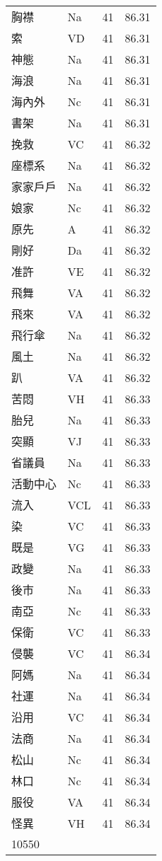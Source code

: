 \documentclass[twocolumn]{book}
\begin{document}
\begin{supertabular}{llrr}
胸襟 & Na & 41 &  86.31\\
索 & VD & 41 &  86.31\\
神態 & Na & 41 &  86.31\\
海浪 & Na & 41 &  86.31\\
海內外 & Nc & 41 &  86.31\\
書架 & Na & 41 &  86.31\\
挽救 & VC & 41 &  86.32\\
座標系 & Na & 41 &  86.32\\
家家戶戶 & Na & 41 &  86.32\\
娘家 & Nc & 41 &  86.32\\
原先 & A & 41 &  86.32\\
剛好 & Da & 41 &  86.32\\
准許 & VE & 41 &  86.32\\
飛舞 & VA & 41 &  86.32\\
飛來 & VA & 41 &  86.32\\
飛行傘 & Na & 41 &  86.32\\
風土 & Na & 41 &  86.32\\
趴 & VA & 41 &  86.32\\
苦悶 & VH & 41 &  86.33\\
胎兒 & Na & 41 &  86.33\\
突顯 & VJ & 41 &  86.33\\
省議員 & Na & 41 &  86.33\\
活動中心 & Nc & 41 &  86.33\\
流入 & VCL & 41 &  86.33\\
染 & VC & 41 &  86.33\\
既是 & VG & 41 &  86.33\\
政變 & Na & 41 &  86.33\\
後市 & Na & 41 &  86.33\\
南亞 & Nc & 41 &  86.33\\
保衛 & VC & 41 &  86.33\\
侵襲 & VC & 41 &  86.34\\
阿媽 & Na & 41 &  86.34\\
社運 & Na & 41 &  86.34\\
沿用 & VC & 41 &  86.34\\
法商 & Na & 41 &  86.34\\
松山 & Nc & 41 &  86.34\\
林口 & Nc & 41 &  86.34\\
服役 & VA & 41 &  86.34\\
怪異 & VH & 41 &  86.34\\
10550\\

\end{supertabular}
\end{document}
